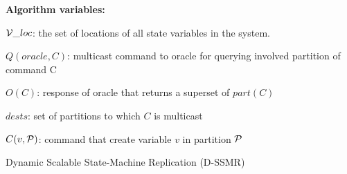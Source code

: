 \begin{algorithm}
\begin{distribalgo}[1]

			

\vspace{1.5mm}

\textbf{Algorithm variables:}

\vspace{1mm}

$\mathcal{V}\_loc$: the set of locations of all state variables in the system.

\vspace{1mm}

$Q(oracle, C)$: multicast command to oracle for querying involved partition of command C

\vspace{1mm}

$O(C)$: response of oracle that returns a superset of $part(C)$

\vspace{1mm}

$dests$: set of partitions to which $C$ is multicast

\vspace{1mm}

$C(v, \mathcal{P})$: command that create variable $v$ in partition $\mathcal{P}$









\caption{Dynamic Scalable State-Machine Replication (D-SSMR)}
\label{alg:dssmr}
\end{distribalgo}
\end{algorithm}


